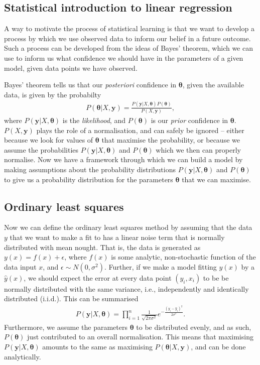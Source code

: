 \documentclass[twocolumn,english,notitlepage]{article}
\renewcommand{\vec}[1]{\boldsymbol{#1}}
\renewcommand{\exp}[1]{e^{#1}}
\begin{document}
    \subsection{Statistical introduction to linear regression}
        A way to motivate the process of statistical learning is that we want to develop a process by which we use observed data to inform our belief in a future outcome. Such a process can be developed from the ideas of Bayes' theorem, which we can use to inform us what confidence we should have in the parameters of a given model, given data points we have observed.
        
        Bayes' theorem tells us that our \textit{posteriori} confidence in $\vec{\theta}$, given the available data, is given by the probabilty
        \begin{align}
            P(\vec{\theta}|X, \vec{y}) = \frac{P(\vec{y}|X,\vec{\vec{\theta}})P(\vec{\theta})}{P(X,\vec{y})},
        \end{align}
        where $P(\vec{y}|X, \vec{\theta})$ is the \textit{likelihood}, and $P(\vec{\theta})$ is our \textit{prior} confidence in $\vec{\theta}$. $P(X,\vec{y})$ plays the role of a normalisation, and can safely be ignored -- either because we look for values of $\vec{\theta}$ that maximise the probability, or because we assume the probabilities $P(\vec{y}|X,\vec{\theta})$ and $P(\vec{\theta})$ which we then can properly normalise. Now we have a framework through which we can build a model by making assumptions about the probability distributions $P(\vec{y}|X,\vec{\theta})$ and $P(\vec{\theta})$ to give us a probability distribution for the parameters $\vec{\theta}$ that we can maximise.


    \subsection{Ordinary least squares}
        Now we can define the ordinary least squares method by assuming that the data $y$ that we want to make a fit to has a linear noise term that is normally distributed with mean nought. That is, the data is generated as $y(x) = f(x) + \epsilon$, where $f(x)$ is some analytic, non-stochastic function of the data input $x$, and $\epsilon \sim N(0, \sigma^2)$. Further, if we make a model fitting $y(x)$ by a $\hat{y}(x)$, we should expect the error at every data point $(y_i, x_i)$ to be be normally distributed with the same variance, i.e., independently and identically distributed (i.i.d.). This can be summarised
        \begin{align}
            P(\vec{y}|X, \vec{\theta}) = \prod_{i=1}^{n} \frac{1}{\sqrt{2\pi\sigma^2}} \exp{-\frac{{(y_i-\hat{y}_i)}^2}{2\sigma^2}}.
        \end{align}
        Furthermore, we assume the parameters $\vec{\theta}$ to be distributed evenly, and as such, $P(\vec{\theta})$ just contributed to an overall normalisation. This means that maximising $P(\vec{y}|X, \vec{\theta})$ amounts to the same as maximising $P(\vec{\theta}|X, \vec{y})$, and can be done analytically.
\end{document}
